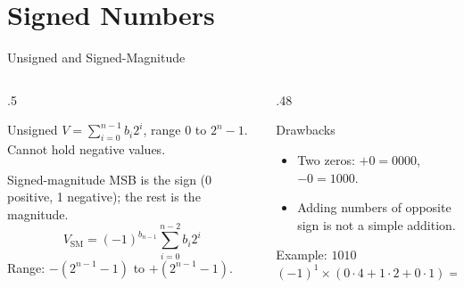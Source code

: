 \documentclass[9pt,aspectratio=169,xcolor=table]{beamer}
\begin{document}
\section{Signed Numbers}

\begin{frame}{Unsigned and Signed-Magnitude}
  \begin{columns}[t]
  \begin{column}{.5\textwidth}
    \begin{block}{Unsigned}
      \small $V = \sum_{i=0}^{n-1} b_i 2^i$, range $0$ to $2^n - 1$.\\
      Cannot hold negative values.
    \end{block}
    \begin{block}{Signed-magnitude}
      \small MSB is the sign (0 positive, 1 negative); the rest is the magnitude.
      \[ V_{\mathrm{SM}} = (-1)^{b_{n-1}} \sum_{i=0}^{n-2} b_i 2^i \]
      Range: $-(2^{n-1}-1)$ to $+(2^{n-1}-1)$.
    \end{block}
  \end{column}
  \begin{column}{.48\textwidth}
    \begin{alertblock}{Drawbacks}
      \small
      \begin{itemize}\itemsep2pt
        \item Two zeros: $+0 = 0000$, $-0 = 1000$.
        \item Adding numbers of opposite sign is not a simple addition.
      \end{itemize}
    \end{alertblock}
    \begin{block}{Example: $1010$}
      \small $(-1)^1 \times (0\cdot4 + 1\cdot2 + 0\cdot1) = -2$
    \end{block}
  \end{column}
  \end{columns}
\end{frame}
\end{document}
